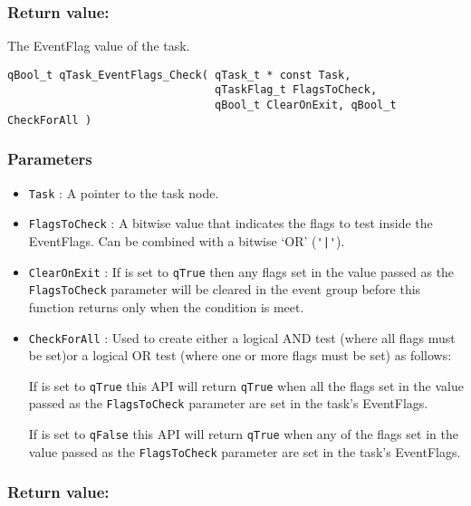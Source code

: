 \subsubsection*{Return value:}

The EventFlag value of the task.

\noindent\hrulefill
\medskip

\begin{lstlisting}[style=CStyle]
qBool_t qTask_EventFlags_Check( qTask_t * const Task, 
                                qTaskFlag_t FlagsToCheck, 
                                qBool_t ClearOnExit, qBool_t CheckForAll )
\end{lstlisting} 

\subsubsection*{Parameters}
\begin{itemize}
    \item \lstinline{Task} : A pointer to the task node.
    \item \lstinline{FlagsToCheck} : A bitwise value that indicates the flags to test inside the EventFlags. Can be combined with a bitwise ‘OR’ (\lstinline{'|'}).
    \item \lstinline{ClearOnExit} : If is set to \lstinline{qTrue} then any flags set in the value passed as the \lstinline{FlagsToCheck} parameter will be cleared in the event group before this function returns only when the condition is meet.
    \item \lstinline{CheckForAll} : Used to create either a logical AND test (where all flags must be set)or a logical OR test (where one or more flags must be set) as follows:
    
    If is set to \lstinline{qTrue} this API will return \lstinline{qTrue} when all the flags set in the value passed as the \lstinline{FlagsToCheck} parameter are set in the task's EventFlags.
    
    If is set to \lstinline{qFalse} this API will return \lstinline{qTrue} when any of the flags set in the value passed as the \lstinline{FlagsToCheck} parameter are set in the task's EventFlags.

\end{itemize}

\subsubsection*{Return value:}

